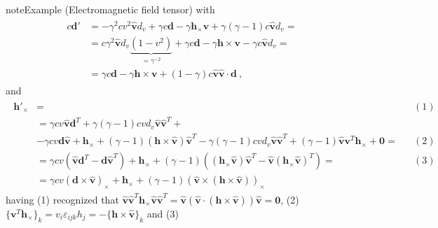 \documentclass[letterpaper,10pt,english]{jupyterBook}
\begin{document}
\begin{sphinxadmonition}{note}{Example  (Electromagnetic field tensor)}
with
\begin{equation*}
\begin{split}\begin{aligned}
  c \mathbf{d}'
  & = - \gamma^2 c v^2 \mathbf{\hat{v}} d_v + \gamma c \mathbf{d} - \gamma \mathbf{h}_\times \mathbf{v} + \gamma(\gamma-1) c \hat{\mathbf{v}}d_v
  = \\
  & = c \gamma^2 \hat{\mathbf{v}} d_v \underbrace{(1 - v^2)}_{= \gamma^{-2}} + \gamma c \mathbf{d} - \gamma \mathbf{h} \times \mathbf{v} - \gamma c \hat{\mathbf{v}} d_v = \\
  & = \gamma c \mathbf{d} - \gamma \mathbf{h} \times \mathbf{v} + ( 1 - \gamma ) c \hat{\mathbf{v}} \hat{\mathbf{v}} \cdot \mathbf{d} \ ,
\end{aligned}\end{split}
\end{equation*}
\sphinxAtStartPar
and
\begin{equation*}
\begin{split}\begin{aligned}
  \mathbf{h}'_{\times} & = && (1) \\
  & = \gamma c v \hat{\mathbf{v}} \mathbf{d}^T + \gamma (\gamma - 1) c v d_v \hat{\mathbf{v}} \hat{\mathbf{v}}^T + \\
  & - \gamma c v \mathbf{d} \hat{\mathbf{v}} + \mathbf{h}_{\times} + (\gamma - 1) (\mathbf{h} \times \hat{\mathbf{v}}) \hat{\mathbf{v}}^T - \gamma (\gamma - 1) c v d_v \hat{\mathbf{v}} \hat{\mathbf{v}}^T + (\gamma-1) \hat{\mathbf{v}} \mathbf{v}^T \mathbf{h}_{\times} + \mathbf{0} = && (2) \\
  & = \gamma c v \left( \hat{\mathbf{v}} \mathbf{d}^T - \mathbf{d} \hat{\mathbf{v}}^T \right) + \mathbf{h}_{\times} + (\gamma-1) \left( \left( \mathbf{h}_\times \hat{\mathbf{v}}  \right) \hat{\mathbf{v}}^T  - \hat{\mathbf{v}} \left( \mathbf{h}_\times \hat{\mathbf{v}}\right)^T \right) = && (3) \\
  & = \gamma c v \left( \mathbf{d} \times \hat{\mathbf{v}} \right)_{\times} + \mathbf{h}_{\times} + (\gamma-1) \left( \hat{\mathbf{v}} \times (\mathbf{h} \times \hat{\mathbf{v}}) \right)_{\times}
\end{aligned}\end{split}
\end{equation*}
\sphinxAtStartPar
having (1) recognized that \(\hat{\mathbf{v}} \hat{\mathbf{v}}^T \mathbf{h}_\times \hat{\mathbf{v}} \hat{\mathbf{v}}^T = \hat{\mathbf{v}}( \hat{\mathbf{v}} \cdot ( \mathbf{h} \times \hat{\mathbf{v}}) ) \hat{\mathbf{v}} = \mathbf{0}\), (2) \(\{ \mathbf{v}^T \mathbf{h}_{\times} \}_k = v_i \varepsilon_{ijk} h_j = - \{ \mathbf{h}\times \hat{\mathbf{v}} \}_k\) and (3)

\end{sphinxadmonition}
\end{document}
